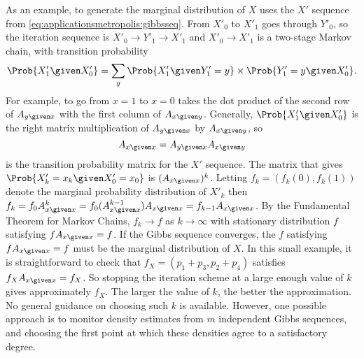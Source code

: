 \documentclass[12pt]{article}
\begin{document}
As an example, to generate the marginal distribution of \( X \) uses the
\( X' \) sequence from \eqref{eq:applicationsmetropolis:gibbsseq}.
From \( X'_0 \) to \( X'_1 \) goes through \( Y'_0 \), so the iteration
sequence is \( X'_0 \to Y'_1 \to X'_1 \) and \( X'_0 \to X'_1 \) is a
two-stage Markov chain, with transition probability
\[
    \Prob{X'_1 \given X'_0} = \sum\limits_y \Prob{X'_1 \given Y'_1
    = y} \times \Prob{Y'_1 = y \given X'_0}.
\] For example, to go from \( x = 1 \) to \( x = 0 \) takes the dot
product of the second row of \( A_{y \given x} \) with the first column
of \( A_{x \given y} \).  Generally, \( \Prob{X'_1 \given X'_0} \) is
the right matrix multiplication of \( A_{y \given x} \) by \( A_{x
\given y} \), so
\[
    A_{x \given x} = A_{ y \given x } A_{x \given y}
\] is the transition probability matrix for the \( X' \) sequence. The
matrix that gives \( \Prob{X'_k = x_k \given X'_0 = x_0} \) is \( (A_{x
\given x})^k \).  Letting \( f_k = (f_k(0), f_k(1)) \) denote the
marginal probability distribution of \( X'_k \) then \( f_k = f_0 A^k_{x
\given x} = f_0 (A^{k-1}_{x \given x}) A_{x \given x} = f_{k-1} A_{x
\given x} \). By the Fundamental Theorem for Markov Chains, \( f_k \to f
\) as \( k \to \infty \) with stationary distribution \( f \) satisfying
\( f A_{x \given x} = f \).  If the Gibbs sequence converges, the \( f \)
satisfying \( f A_{x \given x} = f \) must be the marginal distribution
of \( X \).  In this small example, it is straightforward to check that \(
f_X = ( p_1 + p_3, p_2 + p_4) \) satisfies \( f_X A_{x \given x} = f_X \).
So stopping the iteration scheme at a large enough value of \( k \)
gives approximately \( f_X \).  The larger the value of \( k \), the
better the approximation.  No general guidance on choosing such \( k \)
is available.  However, one possible approach is to monitor density
estimates from \( m \) independent Gibbs sequences, and choosing the
first point at which these densities agree to a satisfactory degree.
\end{document}
